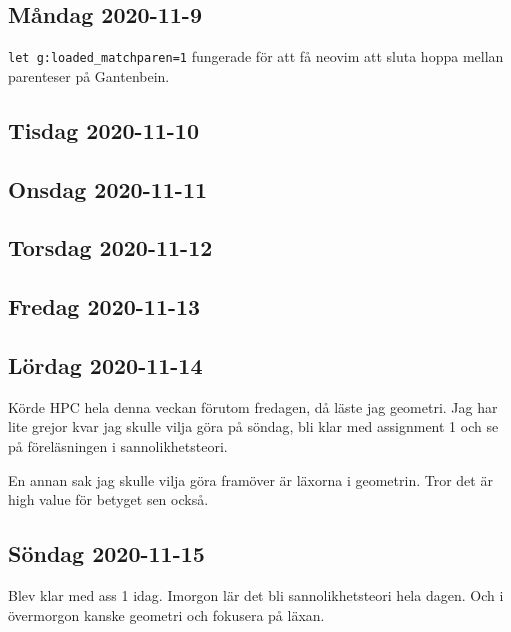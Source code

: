 \subsection{Måndag 2020-11-9}

\verb|let g:loaded_matchparen=1| fungerade för att få neovim att sluta hoppa mellan parenteser på Gantenbein.

\subsection{Tisdag 2020-11-10}

\subsection{Onsdag 2020-11-11}

\subsection{Torsdag 2020-11-12}

\subsection{Fredag 2020-11-13}

\subsection{Lördag 2020-11-14}

Körde HPC hela denna veckan förutom fredagen, då läste jag geometri. Jag har lite grejor kvar jag skulle vilja göra på söndag, bli klar med assignment 1 och se på föreläsningen i sannolikhetsteori.

 En annan sak jag skulle vilja göra framöver är läxorna i geometrin. Tror det är high value för betyget sen också.

\subsection{Söndag 2020-11-15}

Blev klar med ass 1 idag. Imorgon lär det bli sannolikhetsteori hela dagen. Och i övermorgon kanske geometri och fokusera på läxan.
